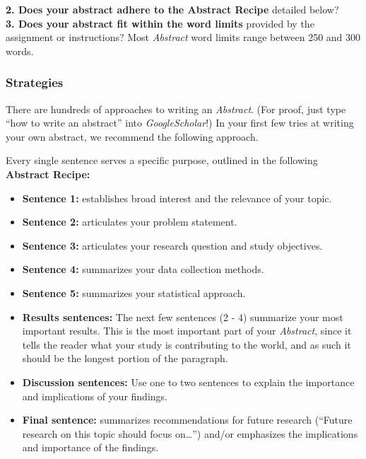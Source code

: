 \documentclass[
]{book}
\providecommand{\tightlist}{%
  \setlength{\itemsep}{0pt}\setlength{\parskip}{0pt}}
\begin{document}
\textbf{2. Does your abstract adhere to the Abstract Recipe} detailed below?\\
\textbf{3. Does your abstract fit within the word limits} provided by the assignment or instructions? Most \emph{Abstract} word limits range between 250 and 300 words.

\hypertarget{strategies}{%
\subsubsection*{Strategies}\label{strategies}}

There are hundreds of approaches to writing an \emph{Abstract}. (For proof, just type ``how to write an abstract'' into \emph{GoogleScholar}!) In your first few tries at writing your own abstract, we recommend the following approach.

Every single sentence serves a specific purpose, outlined in the following \textbf{Abstract Recipe:}

\begin{itemize}
\tightlist
\item
  \textbf{Sentence 1:} establishes broad interest and the relevance of your topic.\\
\item
  \textbf{Sentence 2:} articulates your problem statement.\\
\item
  \textbf{Sentence 3:} articulates your research question and study objectives.\\
\item
  \textbf{Sentence 4:} summarizes your data collection methods.\\
\item
  \textbf{Sentence 5:} summarizes your statistical approach.\\
\item
  \textbf{Results sentences:} The next few sentences (2 - 4) summarize your most important results. This is the most important part of your \emph{Abstract}, since it tells the reader what your study is contributing to the world, and as such it should be the longest portion of the paragraph.
\item
  \textbf{Discussion sentences:} Use one to two sentences to explain the importance and implications of your findings.\\
\item
  \textbf{Final sentence:} summarizes recommendations for future research (``Future research on this topic should focus on\ldots{}'') and/or emphasizes the implications and importance of the findings.
\end{itemize}
\end{document}
